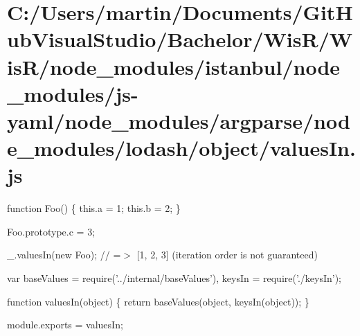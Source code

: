 \hypertarget{_c_1_2_users_2martin_2_documents_2_git_hub_visual_studio_2_bachelor_2_wis_r_2_wis_r_2node_modulebfe93c04eb9e202165e1d0eb97c9ecf5}{}\section{C\+:/\+Users/martin/\+Documents/\+Git\+Hub\+Visual\+Studio/\+Bachelor/\+Wis\+R/\+Wis\+R/node\+\_\+modules/istanbul/node\+\_\+modules/js-\/yaml/node\+\_\+modules/argparse/node\+\_\+modules/lodash/object/values\+In.\+js}
function Foo() \{ this.\+a = 1; this.\+b = 2; \}

Foo.\+prototype.\+c = 3;

\+\_\+.\+values\+In(new Foo); // =$>$ \mbox{[}1, 2, 3\mbox{]} (iteration order is not guaranteed)


\begin{DoxyCodeInclude}
var baseValues = require(\textcolor{stringliteral}{'../internal/baseValues'}),
    keysIn = require(\textcolor{stringliteral}{'./keysIn'});

\textcolor{keyword}{function} valuesIn(\textcolor{keywordtype}{object}) \{
  \textcolor{keywordflow}{return} baseValues(\textcolor{keywordtype}{object}, keysIn(\textcolor{keywordtype}{object}));
\}

module.exports = valuesIn;
\end{DoxyCodeInclude}
 